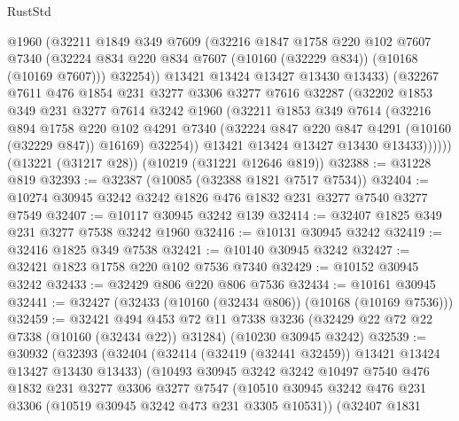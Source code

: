 \begin{lexlean}{RustStd}
\begin{coremodule}
              @1960
              (@32211
                @1849
                @349
                @7609
                (@32216
                  @1847
                  @1758
                  @220
                  @102
                  @7607
                  @7340
                  (@32224 @834 @220 @834 @7607 (@10160 (@32229 @834)) (@10168 (@10169 @7607)))
                  @32254))
              @13421
              @13424
              @13427
              @13430
              @13433)
            (@32267
              @7611
              @476
              @1854
              @231
              @3277
              @3306
              @3277
              @7616
              @32287
              (@32202
                @1853
                @349
                @231
                @3277
                @7614
                @3242
                @1960
                (@32211
                  @1853
                  @349
                  @7614
                  (@32216
                    @894
                    @1758
                    @220
                    @102
                    @4291
                    @7340
                    (@32224 @847 @220 @847 @4291 (@10160 (@32229 @847)) @16169)
                    @32254))
                @13421
                @13424
                @13427
                @13430
                @13433))))))
    (@13221 (@31217 @28))
    (@10219 (@31221 @12646 @819))
@32388 := @31228 @819
@32393 := @32387 (@10085 (@32388 @1821 @7517 @7534))
@32404 := @10274 @30945 @3242 @3242 @1826 @476 @1832 @231 @3277 @7540 @3277 @7549
@32407 := @10117 @30945 @3242 @139
@32414 := @32407 @1825 @349 @231 @3277 @7538 @3242 @1960
@32416 := @10131 @30945 @3242
@32419 := @32416 @1825 @349 @7538
@32421 := @10140 @30945 @3242
@32427 := @32421 @1823 @1758 @220 @102 @7536 @7340
@32429 := @10152 @30945 @3242
@32433 := @32429 @806 @220 @806 @7536
@32434 := @10161 @30945
@32441 := @32427 (@32433 (@10160 (@32434 @806)) (@10168 (@10169 @7536)))
@32459 := @32421
    @494
    @453
    @72
    @11
    @7338
    @3236
    (@32429 @22 @72 @22 @7338 (@10160 (@32434 @22)) @31284)
    (@10230 @30945 @3242)
@32539 := @30932
    (@32393
      (@32404
        (@32414 (@32419 (@32441 @32459)) @13421 @13424 @13427 @13430 @13433)
        (@10493
          @30945
          @3242
          @3242
          @10497
          @7540
          @476
          @1832
          @231
          @3277
          @3306
          @3277
          @7547
          (@10510 @30945 @3242 @476 @231 @3306 (@10519 @30945 @3242 @473 @231 @3305 @10531))
          (@32407
            @1831

\end{coremodule}
\end{lexlean}

